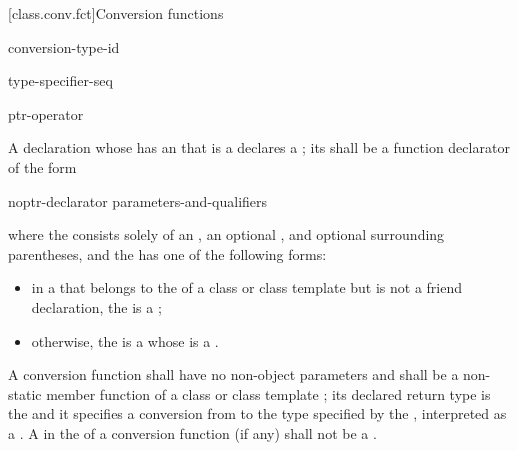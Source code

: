 [class.conv.fct]{Conversion functions}%
%
%
%

\begin{bnf}
\br
     conversion-type-id
\end{bnf}

\begin{bnf}
\br
    type-specifier-seq 
\end{bnf}

\begin{bnf}
\br
    ptr-operator 
\end{bnf}

\pnum
A declaration
whose  has
an  that is a 
declares a ;
its  shall be
a function declarator of the form
\begin{ncsimplebnf}
noptr-declarator parameters-and-qualifiers
\end{ncsimplebnf}
where the  consists solely of
an ,
an optional , and
optional surrounding parentheses, and
the  has one of the following forms:
\begin{itemize}
\item
in a  that belongs to
the  of a class or class template
but is not a friend declaration,
the  is a ;
\item
otherwise, the  is a 
whose  is a .
\end{itemize}

\pnum
A conversion function  shall have no non-object parameters and
shall be a non-static member function of a class or class template ;
its declared return type is the  and
it specifies a conversion from  to
the type specified by the ,
interpreted as a .
A  in the 
of a conversion function (if any) shall not be
a .

